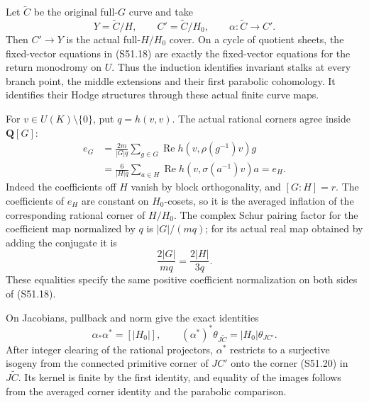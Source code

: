 Let \(\widetilde C\) be the original full-\(G\) curve and take
\[
 Y=\widetilde C/H,\qquad C'=\widetilde C/H_0,
             \qquad \alpha:\widetilde C\longrightarrow C'.
                                                               \tag{S51.19}
\]
Then \(C'\to Y\) is the actual full-\(H/H_0\) cover.
On a cycle of quotient sheets, the fixed-vector equations in
(S51.18) are exactly the fixed-vector equations for the return
monodromy on \(U\). Thus the induction identifies invariant
stalks at every branch point, the middle extensions and their
first parabolic cohomology. It identifies their Hodge structures
through these actual finite curve maps.

For \(v\in U(K)\setminus\{0\}\), put \(q=h(v,v)\).
The actual rational corners agree inside \(\mathbf Q[G]\):
\[
 \begin{aligned}
 e_G&=\frac{2m}{|G|q}\sum_{g\in G}
       \operatorname{Re}h(v,\rho(g^{-1})v)g\\
    &=\frac6{|H|q}\sum_{a\in H}
       \operatorname{Re}h(v,\sigma(a^{-1})v)a=e_H.
 \end{aligned}                                               \tag{S51.20}
\]
Indeed the coefficients off \(H\) vanish by block
orthogonality, and \([G:H]=r\). The coefficients of \(e_H\)
are constant on \(H_0\)-cosets, so it is the averaged
inflation of the corresponding rational corner of \(H/H_0\).
The complex Schur pairing factor for the coefficient map
normalized by \(q\) is \(|G|/(mq)\); for its actual real
map obtained by adding the conjugate it is
\[
                       \frac{2|G|}{mq}=\frac{2|H|}{3q}.
                                                               \tag{S51.21}
\]
These equalities specify the same positive coefficient
normalization on both sides of (S51.18).

On Jacobians, pullback and norm give the exact identities
\[
 \alpha_*\alpha^*=[|H_0|],\qquad
        (\alpha^*)^*\theta_{J\widetilde C}
                            =|H_0|\theta_{JC'}.
                                                               \tag{S51.22}
\]
After integer clearing of the rational projectors,
\(\alpha^*\) restricts to a surjective isogeny from the
connected primitive corner of \(JC'\) onto the corner
(S51.20) in \(J\widetilde C\). Its kernel is finite by
the first identity, and equality of the images follows from
the averaged corner identity and the parabolic comparison.

